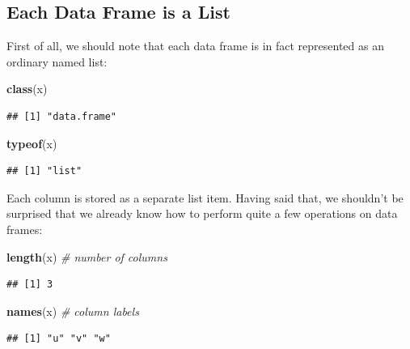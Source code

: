 \documentclass[10pt,b5paper,krantz1]{krantz}
\newenvironment{Shaded}{\begin{snugshade}}{\end{snugshade}}
\newcommand{\CommentTok}[1]{\textcolor[rgb]{0.37,0.37,0.37}{\textit{#1}}}
\newcommand{\KeywordTok}[1]{\textcolor[rgb]{0.27,0.27,0.27}{\textbf{#1}}}
\newcommand{\NormalTok}[1]{#1}
\begin{document}
\hypertarget{each-data-frame-is-a-list}{%
\subsection{Each Data Frame is a List}\label{each-data-frame-is-a-list}}

First of all, we should note that
each data frame is in fact represented as an ordinary named list:

\begin{Shaded}
\begin{Highlighting}[]
\KeywordTok{class}\NormalTok{(x)}
\end{Highlighting}
\end{Shaded}

\begin{verbatim}
## [1] "data.frame"
\end{verbatim}

\begin{Shaded}
\begin{Highlighting}[]
\KeywordTok{typeof}\NormalTok{(x)}
\end{Highlighting}
\end{Shaded}

\begin{verbatim}
## [1] "list"
\end{verbatim}

Each column is stored as a separate list item.
Having said that, we shouldn't be surprised that we already know
how to perform quite a few operations on data frames:

\begin{Shaded}
\begin{Highlighting}[]
\KeywordTok{length}\NormalTok{(x) }\CommentTok{# number of columns}
\end{Highlighting}
\end{Shaded}

\begin{verbatim}
## [1] 3
\end{verbatim}

\begin{Shaded}
\begin{Highlighting}[]
\KeywordTok{names}\NormalTok{(x)  }\CommentTok{# column labels}
\end{Highlighting}
\end{Shaded}

\begin{verbatim}
## [1] "u" "v" "w"
\end{verbatim}
\end{document}
